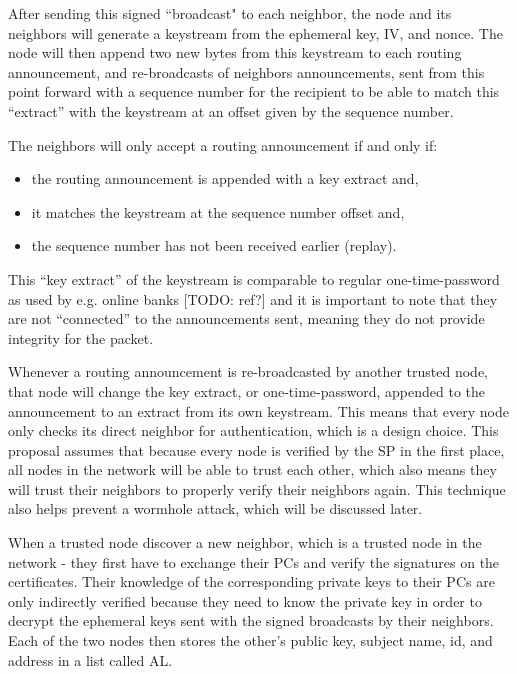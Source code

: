 After sending this signed ``broadcast" to each neighbor, the node and its
neighbors will generate a keystream from the ephemeral key, IV, and nonce. The
node will then append two new bytes from this keystream to each routing
announcement, and re-broadcasts of neighbors announcements, sent from this point
forward with a sequence number for the recipient to be able to match this
``extract'' with the keystream at an offset given by the sequence number.

The neighbors will only accept a routing announcement if and only if:

\begin{itemize}
  \item the routing announcement is appended with a key extract and,
  \item it matches the keystream at the sequence number offset and,
  \item the sequence number has not been received earlier (replay).
\end{itemize}

This ``key extract'' of the keystream is comparable to regular one-time-password
as used by e.g. online banks [TODO: ref?] and it is important to note that they
are not ``connected'' to the announcements sent, meaning they do not
provide integrity for the packet.

Whenever a routing announcement is re-broadcasted by another trusted node, that
node will change the key extract, or one-time-password, appended to the
announcement to an extract from its own keystream. This means that every node
only checks its direct neighbor for authentication, which is a design choice.
This proposal assumes that because every node is verified by the \ac{SP} in the
first place, all nodes in the network will be able to trust each other, which
also means they will trust their neighbors to properly verify their neighbors
again. This technique also helps prevent a wormhole attack, which will be
discussed later.


When a trusted node discover a new neighbor, which is a trusted node in the
network - they first have to exchange their \acp{PC} and verify the signatures
on the certificates. Their knowledge of the corresponding private keys to their
\acp{PC} are only indirectly verified because they need to know the private key
in order to decrypt the ephemeral keys sent with the signed broadcasts by their
neighbors. Each of the two nodes then stores the other's public key, subject
name, id, and address in a list called \ac{AL}.

